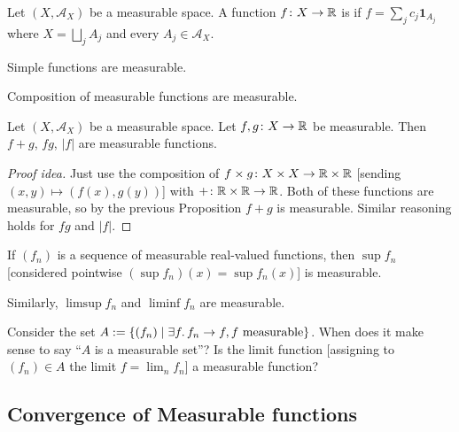\begin{definition}
Let $(X,\mathcal{A}_{X})$ be a measurable space.
A function $f\colon X\to\mathbb{R}$ is  if
$f=\sum_{j}c_{j}\mathbf{1}_{A_{j}}$ where $X=\bigsqcup_{j}A_{j}$ and
every $A_{j}\in\mathcal{A}_{X}$.
\end{definition}

\begin{proposition}
Simple functions are measurable.
\end{proposition}

\begin{proposition}
Composition of measurable functions are measurable.
\end{proposition}

\begin{proposition}
Let $(X,\mathcal{A}_{X})$ be a measurable space.
Let $f,g\colon X\to\mathbb{R}$ be measurable. Then $f+g$, $fg$, $|f|$ are
measurable functions.
\end{proposition}

\begin{proof}[Proof idea]
Just use the composition of $f\times g\colon X\times X\to\mathbb{R}\times\mathbb{R}$
[sending $(x,y)\mapsto(f(x),g(y))$] with $+\colon\mathbb{R}\times\mathbb{R}\to\mathbb{R}$.
Both of these functions are measurable, so by the previous Proposition
$f+g$ is measurable. Similar reasoning holds for $fg$ and $|f|$.
\end{proof}

\begin{proposition}
If $(f_{n})$ is a sequence of measurable real-valued functions, then
$\sup f_{n}$ [considered pointwise $(\sup f_{n})(x)=\sup f_{n}(x)$] is measurable.
\end{proposition}

\begin{proposition}
Similarly, $\limsup f_{n}$ and $\liminf f_{n}$ are measurable.
\end{proposition}

\begin{puzzle}
Consider the set $A:=\{(f_{n})\mid \exists f\ldotp f_{n}\to f, f\mbox{ measurable}\}$.
When does it make sense to say ``$A$ is a measurable set''? Is the
limit function [assigning to $(f_{n})\in A$ the limit $f=\lim_{n}f_{n}$]
a measurable function?
\end{puzzle}

\subsection{Convergence of Measurable functions}

